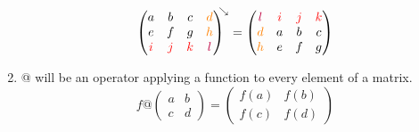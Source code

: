 \documentclass{article}
\begin{document}
\begin{enumerate}
\begin{equation}
\begin{pmatrix}
a & b & c & {\color{orange}d} \\
e & f & g & {\color{orange}h} \\
{\color{red}i} & {\color{red}j} & {\color{red}k}  & {\color{purple}l} 
\end{pmatrix}
^{\hspace{-1.5mm}\searrow}
=
\begin{pmatrix}
{\color{purple}l}  & {\color{red}i} & {\color{red}j} & {\color{red}k} \\
{\color{orange}d} & a & b & c \\
{\color{orange}h} & e & f & g \\
\end{pmatrix}
\end{equation}

\item 
@ will be an operator applying a function to every element of a matrix. 
\begin{equation}
f\text{@}
\begin{pmatrix}
a & b \\
c & d
\end{pmatrix}
=
\begin{pmatrix}
f(a) & f(b) \\
f(c) & f(d)
\end{pmatrix}
\end{equation}


\end{enumerate}
\end{document}
